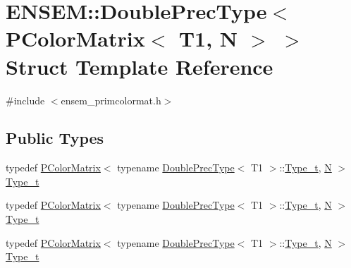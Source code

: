 \hypertarget{structENSEM_1_1DoublePrecType_3_01PColorMatrix_3_01T1_00_01N_01_4_01_4}{}\section{E\+N\+S\+EM\+:\+:Double\+Prec\+Type$<$ P\+Color\+Matrix$<$ T1, N $>$ $>$ Struct Template Reference}
\label{structENSEM_1_1DoublePrecType_3_01PColorMatrix_3_01T1_00_01N_01_4_01_4}


{\ttfamily \#include $<$ensem\+\_\+primcolormat.\+h$>$}

\subsection*{Public Types}
\begin{DoxyCompactItemize}
\item 
typedef \mbox{\hyperlink{classENSEM_1_1PColorMatrix}{P\+Color\+Matrix}}$<$ typename \mbox{\hyperlink{structENSEM_1_1DoublePrecType}{Double\+Prec\+Type}}$<$ T1 $>$\+::\mbox{\hyperlink{structENSEM_1_1DoublePrecType_3_01PColorMatrix_3_01T1_00_01N_01_4_01_4_ad34f205ddad59c047cf49ac9972cdaeb}{Type\+\_\+t}}, \mbox{\hyperlink{adat__devel_2lib_2hadron_2operator__name__util_8cc_a7722c8ecbb62d99aee7ce68b1752f337}{N}} $>$ \mbox{\hyperlink{structENSEM_1_1DoublePrecType_3_01PColorMatrix_3_01T1_00_01N_01_4_01_4_ad34f205ddad59c047cf49ac9972cdaeb}{Type\+\_\+t}}
\item 
typedef \mbox{\hyperlink{classENSEM_1_1PColorMatrix}{P\+Color\+Matrix}}$<$ typename \mbox{\hyperlink{structENSEM_1_1DoublePrecType}{Double\+Prec\+Type}}$<$ T1 $>$\+::\mbox{\hyperlink{structENSEM_1_1DoublePrecType_3_01PColorMatrix_3_01T1_00_01N_01_4_01_4_ad34f205ddad59c047cf49ac9972cdaeb}{Type\+\_\+t}}, \mbox{\hyperlink{adat__devel_2lib_2hadron_2operator__name__util_8cc_a7722c8ecbb62d99aee7ce68b1752f337}{N}} $>$ \mbox{\hyperlink{structENSEM_1_1DoublePrecType_3_01PColorMatrix_3_01T1_00_01N_01_4_01_4_ad34f205ddad59c047cf49ac9972cdaeb}{Type\+\_\+t}}
\item 
typedef \mbox{\hyperlink{classENSEM_1_1PColorMatrix}{P\+Color\+Matrix}}$<$ typename \mbox{\hyperlink{structENSEM_1_1DoublePrecType}{Double\+Prec\+Type}}$<$ T1 $>$\+::\mbox{\hyperlink{structENSEM_1_1DoublePrecType_3_01PColorMatrix_3_01T1_00_01N_01_4_01_4_ad34f205ddad59c047cf49ac9972cdaeb}{Type\+\_\+t}}, \mbox{\hyperlink{adat__devel_2lib_2hadron_2operator__name__util_8cc_a7722c8ecbb62d99aee7ce68b1752f337}{N}} $>$ \mbox{\hyperlink{structENSEM_1_1DoublePrecType_3_01PColorMatrix_3_01T1_00_01N_01_4_01_4_ad34f205ddad59c047cf49ac9972cdaeb}{Type\+\_\+t}}
\end{DoxyCompactItemize}


